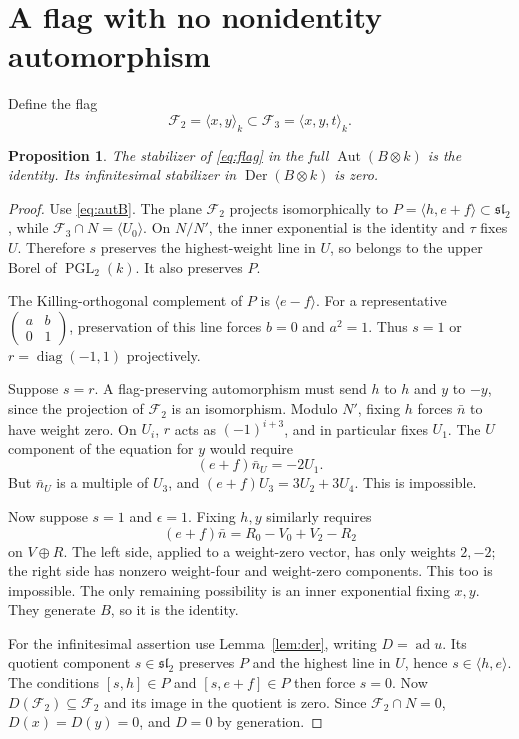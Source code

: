\documentclass[11pt]{article}
\newtheorem{proposition}[theorem]{Proposition}
\theoremstyle{definition}\newtheorem{definition}[theorem]{Definition}
\theoremstyle{remark}\newtheorem{remark}[theorem]{Remark}
\DeclareMathOperator{\Aut}{Aut}
\DeclareMathOperator{\Der}{Der}
\DeclareMathOperator{\ad}{ad}
\DeclareMathOperator{\PGL}{PGL}
\newcommand{\FF}{\mathcal F}
\begin{document}
\section{A flag with no nonidentity automorphism}
Define the flag
\begin{equation}\label{eq:flag}
 \FF_2=\langle x,y\rangle_k\subset\FF_3=\langle x,y,t\rangle_k.
\end{equation}
\begin{proposition}\label{prop:flag}
The stabilizer of \eqref{eq:flag} in the full $\Aut(B\otimes k)$ is the
identity. Its infinitesimal stabilizer in $\Der(B\otimes k)$ is zero.
\end{proposition}
\begin{proof}
Use \eqref{eq:autB}. The plane $\FF_2$ projects isomorphically to
$P=\langle h,e+f\rangle\subset\mathfrak{sl}_2$, while
$\FF_3\cap N=\langle U_0\rangle$. On $N/N'$, the inner exponential is the
identity and $\tau$ fixes $U$. Therefore $s$ preserves the highest-weight
line in $U$, so belongs to the upper Borel of $\PGL_2(k)$.
It also preserves $P$.

The Killing-orthogonal complement of $P$ is $\langle e-f\rangle$.
For a representative $\left(\begin{smallmatrix}a&b\\0&1\end{smallmatrix}\right)$,
preservation of this line forces $b=0$ and $a^2=1$. Thus $s=1$ or
$r=\operatorname{diag}(-1,1)$ projectively.

Suppose $s=r$. A flag-preserving automorphism must send $h$ to $h$ and $y$
to $-y$, since the projection of $\FF_2$ is an isomorphism.
Modulo $N'$, fixing $h$ forces $\bar n$ to have weight zero. On $U_i$, $r$
acts as $(-1)^{i+3}$, and in particular fixes $U_1$.
The $U$ component of the equation for $y$ would require
\[
 (e+f)\bar n_U=-2U_1.
\]
But $\bar n_U$ is a multiple of $U_3$, and
$(e+f)U_3=3U_2+3U_4$. This is impossible.

Now suppose $s=1$ and $\epsilon=1$. Fixing $h,y$ similarly requires
\[
 (e+f)\bar n=R_0-V_0+V_2-R_2
\]
on $V\oplus R$. The left side, applied to a weight-zero vector, has only
weights $2,-2$; the right side has nonzero weight-four and weight-zero
components. This too is impossible. The only remaining possibility is an
inner exponential fixing $x,y$. They generate $B$, so it is the identity.

For the infinitesimal assertion use Lemma~\ref{lem:der}, writing $D=\ad u$.
Its quotient component $s\in\mathfrak{sl}_2$ preserves $P$ and the highest
line in $U$, hence $s\in\langle h,e\rangle$.
The conditions $[s,h]\in P$ and $[s,e+f]\in P$ then force $s=0$.
Now $D(\FF_2)\subseteq\FF_2$ and its image in the quotient is zero.
Since $\FF_2\cap N=0$, $D(x)=D(y)=0$, and $D=0$ by generation.
\end{proof}
\end{document}
